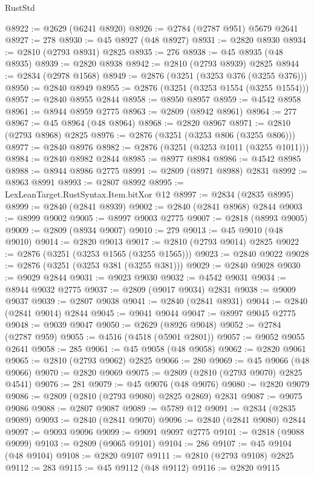 \begin{lexlean}{RustStd}
\begin{coremodule}
@8922 := @2629 (@6241 @8920)
@8926 := @2784 (@2787 @951) @5679 @2641
@8927 := 278
@8930 := @45 @8927 (@48 @8927)
@8931 := @2820 @8930
@8934 := @2810 (@2793 @8931) @2825
@8935 := 276
@8938 := @45 @8935 (@48 @8935)
@8939 := @2820 @8938
@8942 := @2810 (@2793 @8939) @2825
@8944 := @2834 (@2978 @1568)
@8949 := @2876 (@3251 (@3253 @376 (@3255 @376)))
@8950 := @2840 @8949
@8955 := @2876 (@3251 (@3253 @1554 (@3255 @1554)))
@8957 := @2840 @8955 @2844
@8958 := @8950 @8957
@8959 := @4542 @8958
@8961 := @8944 @8959 @2775
@8963 := @2809 (@8942 @8961)
@8964 := 277
@8967 := @45 @8964 (@48 @8964)
@8968 := @2820 @8967
@8971 := @2810 (@2793 @8968) @2825
@8976 := @2876 (@3251 (@3253 @806 (@3255 @806)))
@8977 := @2840 @8976
@8982 := @2876 (@3251 (@3253 @1011 (@3255 @1011)))
@8984 := @2840 @8982 @2844
@8985 := @8977 @8984
@8986 := @4542 @8985
@8988 := @8944 @8986 @2775
@8991 := @2809 (@8971 @8988) @2831
@8992 := @8963 @8991
@8993 := @2807 @8992
@8995 := LexLeanTarget.RustSyntax.Item.bitXor @12
@8997 := @2834 (@2835 @8995)
@8999 := @2840 (@2841 @8939)
@9002 := @2840 (@2841 @8968) @2844
@9003 := @8999 @9002
@9005 := @8997 @9003 @2775
@9007 := @2818 (@8993 @9005)
@9009 := @2809 (@8934 @9007)
@9010 := 279
@9013 := @45 @9010 (@48 @9010)
@9014 := @2820 @9013
@9017 := @2810 (@2793 @9014) @2825
@9022 := @2876 (@3251 (@3253 @1565 (@3255 @1565)))
@9023 := @2840 @9022
@9028 := @2876 (@3251 (@3253 @381 (@3255 @381)))
@9029 := @2840 @9028
@9030 := @9029 @2844
@9031 := @9023 @9030
@9032 := @4542 @9031
@9034 := @8944 @9032 @2775
@9037 := @2809 (@9017 @9034) @2831
@9038 := @9009 @9037
@9039 := @2807 @9038
@9041 := @2840 (@2841 @8931)
@9044 := @2840 (@2841 @9014) @2844
@9045 := @9041 @9044
@9047 := @8997 @9045 @2775
@9048 := @9039 @9047
@9050 := @2629 (@8926 @9048)
@9052 := @2784 (@2787 @959)
@9055 := @4516 (@4518 (@5901 @2801))
@9057 := @9052 @9055 @2641
@9058 := 285
@9061 := @45 @9058 (@48 @9058)
@9062 := @2820 @9061
@9065 := @2810 (@2793 @9062) @2825
@9066 := 280
@9069 := @45 @9066 (@48 @9066)
@9070 := @2820 @9069
@9075 := @2809 (@2810 (@2793 @9070) @2825 @4541)
@9076 := 281
@9079 := @45 @9076 (@48 @9076)
@9080 := @2820 @9079
@9086 := @2809 (@2810 (@2793 @9080) @2825 @2869) @2831
@9087 := @9075 @9086
@9088 := @2807 @9087
@9089 := @5789 @12
@9091 := @2834 (@2835 @9089)
@9093 := @2840 (@2841 @9070)
@9096 := @2840 (@2841 @9080) @2844
@9097 := @9093 @9096
@9099 := @9091 @9097 @2775
@9101 := @2818 (@9088 @9099)
@9103 := @2809 (@9065 @9101)
@9104 := 286
@9107 := @45 @9104 (@48 @9104)
@9108 := @2820 @9107
@9111 := @2810 (@2793 @9108) @2825
@9112 := 283
@9115 := @45 @9112 (@48 @9112)
@9116 := @2820 @9115

\end{coremodule}
\end{lexlean}
